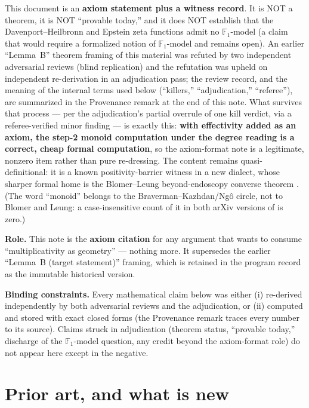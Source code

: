 \documentclass[11pt]{article}
\theoremstyle{plain}
\theoremstyle{definition}
\theoremstyle{remark}
\begin{document}
This document is an \textbf{axiom statement plus a witness record}. It is NOT a
theorem, it is NOT ``provable today,'' and it does NOT establish that the
Davenport--Heilbronn and Epstein zeta functions admit no
$\mathbb{F}_1$-model (a claim that would require a formalized notion of
$\mathbb{F}_1$-model and remains open). An earlier ``Lemma~B'' theorem framing of
this material was refuted by two independent adversarial reviews (blind
replication) and the refutation was upheld on independent re-derivation in an
adjudication pass; the review record, and the meaning of the internal terms used
below (``killers,'' ``adjudication,'' ``referee''), are summarized in the
Provenance remark at the end of this note. What survives that process --- per the
adjudication's partial overrule of one kill verdict, via a referee-verified minor
finding --- is exactly this: \textbf{with effectivity added as an axiom, the
step-2 monoid computation under the degree reading is a correct, cheap formal
computation}, so the axiom-format note is a legitimate, nonzero item rather than
pure re-dressing. The content remains quasi-definitional: it is a known
positivity-barrier witness in a new dialect, whose sharper formal home is the
Blomer--Leung beyond-endoscopy converse theorem \cite{BL}. (The word ``monoid''
belongs to the Braverman--Kazhdan/Ng\^o circle, not to Blomer and Leung: a
case-insensitive count of it in both arXiv versions of \cite{BL} is zero.)

\medskip
\noindent\textbf{Role.} This note is the \textbf{axiom citation} for any argument
that wants to consume ``multiplicativity as geometry'' --- nothing more. It
supersedes the earlier ``Lemma~B (target statement)'' framing, which is retained
in the program record as the immutable historical version.

\medskip
\noindent\textbf{Binding constraints.} Every mathematical claim below was either
(i) re-derived independently by both adversarial reviews and the adjudication, or
(ii) computed and stored with exact closed forms (the Provenance remark traces
every number to its source). Claims struck in adjudication (theorem status,
``provable today,'' discharge of the $\mathbb{F}_1$-model question, any credit
beyond the axiom-format role) do not appear here except in the negative.

\section{Prior art, and what is new}\label{sec:priorart}
\end{document}
